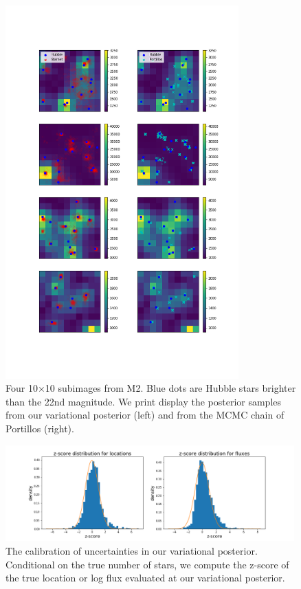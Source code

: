 \begin{figure}[h]
    \centering
    \vspace{-3cm}
    \includegraphics[width=0.8\textwidth]{figures/example_subimages_samples.png}
    \vspace{-3cm}
    \caption{Four 10$\times$10 subimages from
    M2. Blue dots are Hubble stars brighter than the 22nd magnitude.
    We print display the posterior samples from our variational
    posterior (left) and from the MCMC chain of Portillos (right). }
    \label{fig:example_subimages_sampled}
\end{figure}

\begin{figure}[h]
    \centering
    \includegraphics[width=0.99\textwidth]{figures/z-score_calibration.png}
    \caption{The calibration of uncertainties in our variational posterior. Conditional on the true number of stars, we compute the z-score of the true location or log flux evaluated at our
    variational posterior. }
    \label{fig:z-score_calibration}
\end{figure}


